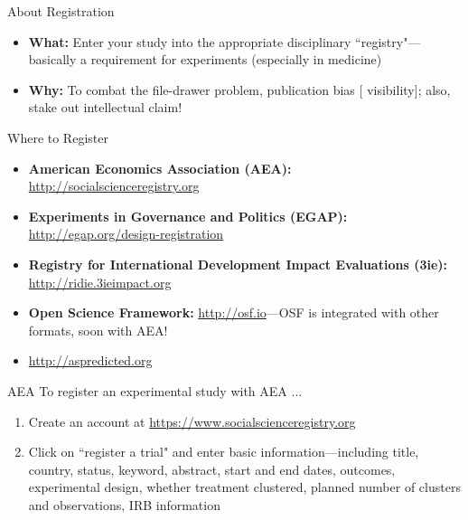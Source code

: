 \documentclass[12pt, compress]{beamer} %
\let\noteitem\item %
\renewcommand{\item}{ 
	\noteitem\vspace{\fill}
	}
\newcommand{\nb}[1]{{\color{burntorange} {#1}}}
\begin{document}
	\begin{frame}{About Registration}
		\begin{itemize}
			\item \textbf{What:} Enter your study into the appropriate disciplinary ``registry"---basically a requirement for experiments (especially in medicine)
			\item \textbf{Why:} To combat the file-drawer problem, publication bias [\nb{visibility}]; also, stake out intellectual claim!
		\end{itemize}
	\end{frame}
	
%		
%		
	
	\begin{frame}{Where to Register}
		\begin{itemize}
			\item \textbf{American Economics Association (AEA):} \url{http://socialscienceregistry.org}
			\item \textbf{Experiments in Governance and Politics (EGAP):} \url{http://egap.org/design-registration}
			\item \textbf{Registry for International Development Impact Evaluations (3ie):} \url{http://ridie.3ieimpact.org}
			\item \textbf{Open Science Framework:} \url{http://osf.io}---OSF is integrated with other formats, soon with AEA!
			\item \url{http://aspredicted.org}
		\end{itemize}
		\end{frame}
	
	\begin{frame}{AEA}
		To register an experimental study with AEA ...
		
		\begin{enumerate}
			\item Create an account at \url{https://www.socialscienceregistry.org}
			\item Click on ``register a trial" and enter basic information---including title, country, status, keyword, abstract, start and end dates, outcomes, experimental design, whether treatment clustered, planned number of clusters and observations, IRB information
		\end{enumerate}
	\end{frame}	
		
\end{document}
